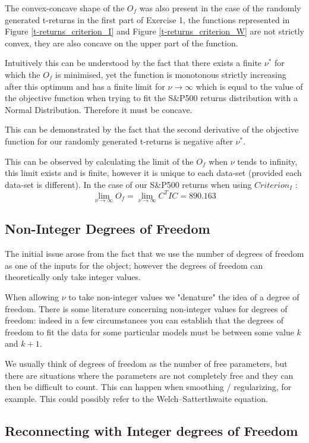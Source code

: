 The convex-concave shape of the $O_f$ was also present in the case of the randomly generated t-returns in the first part of Exercise 1, the functions represented in Figure \ref{t-returns_criterion_I} and Figure \ref{t-returns_criterion_W} are not strictly convex, they are also concave on the upper part of the function.
\smallskip\par
Intuitively this can be understood by the fact that there exists a finite $\nu^*$ for which the $O_f$ is minimised, yet the function is monotonous strictly increasing after this optimum and has a finite limit for $\nu \to \infty$ which is equal to the value of the objective function when trying to fit the S\&P500 returns distribution with a Normal Distribution. Therefore it must be concave. 
\smallskip\par
This can be demonstrated by the fact that the second derivative of the objective function for our randomly generated t-returns is negative after $\nu^*$.
\smallskip\par
This can be observed by calculating the limit of the $O_f$ when $\nu$ tends to infinity, this limit exists and is finite, however it is unique to each data-set (provided each data-set is different). In the case of our S\&P500 returns when using $Criterion_I$ :
\begin{equation*}
    \lim_{\nu \to \infty}O_f = \lim_{\nu \to \infty}C^T I C = 890.163
\end{equation*}

\subsection{Non-Integer Degrees of Freedom}
The initial issue arose from the fact that we use the number of degrees of freedom as one of the inputs for the object; however the degrees of freedom can theoretically only take integer values.
\smallskip\par
When allowing $\nu$ to take non-integer values we "denature" the idea of a degree of freedom. There is some literature concerning non-integer values for degrees of freedom: indeed in a few circumstances you can establish that the degrees of freedom to fit the data for some particular models must be between some value $k$ and $k+1$.
\smallskip\par
We usually think of degrees of freedom as the number of free parameters, but there are situations where the parameters are not completely free and they can then be difficult to count. This can happen when smoothing / regularizing, for example. This could possibly refer to the Welch–Satterthwaite equation.

\subsection{Reconnecting with Integer degrees of Freedom}